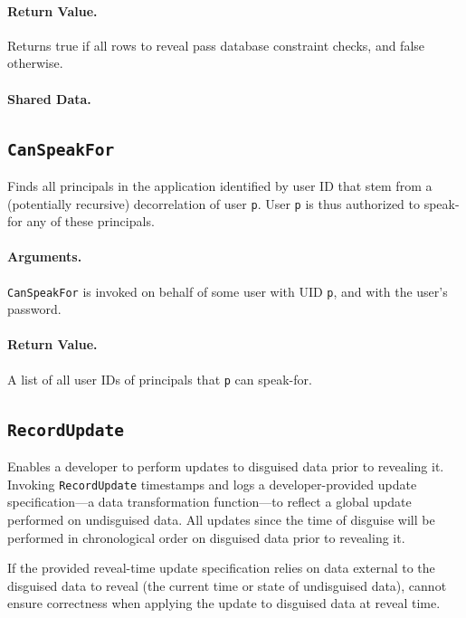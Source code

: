     \paragraph{Return Value.} 
    Returns true if all rows to reveal pass database constraint checks, and false otherwise.

    \paragraph{Shared Data.}

\subsection{\texttt{CanSpeakFor}}

    Finds all principals in the application identified by user ID that stem from
    a (potentially recursive) decorrelation of user \texttt{p}.
    User \texttt{p} is thus authorized to speak-for any of these principals.

    \paragraph{Arguments.} 
    \texttt{CanSpeakFor} is invoked on behalf of some user with UID \texttt{p},
    and with the user's password.

    \paragraph{Return Value.} 
    A list of all user IDs of principals that \texttt{p} can
    speak-for.

\subsection{\texttt{RecordUpdate}}
\label{s:semantics:updates}

Enables a developer to perform updates to disguised data prior to revealing it.
Invoking \texttt{RecordUpdate} timestamps and logs a developer-provided update
specification---a data transformation function---to reflect a global update
performed on undisguised data. All updates since the time of disguise will be
performed in chronological order on disguised data prior to revealing it.

If the provided reveal-time update specification relies on data external to the
disguised data to reveal (\eg the current time or state of undisguised data),
\sys cannot ensure correctness when applying the update to disguised data at
reveal time.

